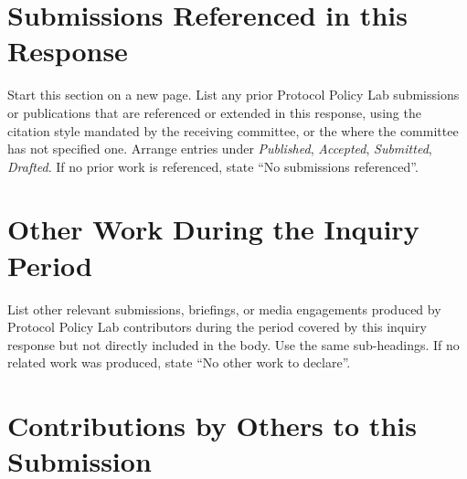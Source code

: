 

\section{Submissions Referenced in this Response}

\begin{instructional}
Start this section on a new page. List any prior Protocol Policy Lab submissions or publications that are referenced or extended in this response, using the citation style mandated by the receiving committee, or the \href{https://www.stylemanual.gov.au/}{\color{blue}{Australian Government Style Manual}} where the committee has not specified one. Arrange entries under \textit{Published}, \textit{Accepted}, \textit{Submitted}, \textit{Drafted}. If no prior work is referenced, state ``No submissions referenced''.
\end{instructional}


\section{Other Work During the Inquiry Period}

\begin{instructional}
List other relevant submissions, briefings, or media engagements produced by Protocol Policy Lab contributors during the period covered by this inquiry response but not directly included in the body. Use the same sub-headings. If no related work was produced, state ``No other work to declare''.
\end{instructional}


\clearpage
\section{Contributions by Others to this Submission}

